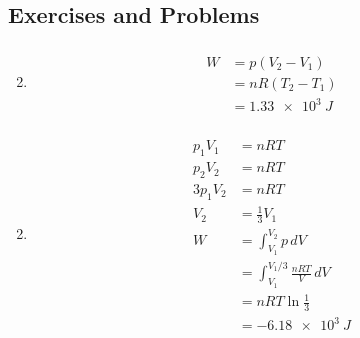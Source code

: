 \documentclass{article}
\begin{document}
\subsection{Exercises and Problems}

\subsubsection{}

\begin{enumerate}
  \setcounter{enumi}{1}
  \item

        \begin{align*}
          W & = p (V_2 - V_1)   \\
            & = n R (T_2 - T_1) \\
            & = \qty{1.33e3}{J}
        \end{align*}
\end{enumerate}

\setcounter{subsubsection}{2}
\subsubsection{}

\begin{enumerate}
  \setcounter{enumi}{1}
  \item

        \begin{align*}
          p_1 V_1   & = n R T                                      \\
          p_2 V_2   & = n R T                                      \\
          3 p_1 V_2 & = n R T                                      \\
          V_2       & = \frac{1}{3} V_1                            \\
          W         & = \int_{V_1}^{V_2} p \,d V                   \\
                    & = \int_{V_1}^{V_1 / 3} \frac{n R T}{V} \,d V \\
                    & = n R T \ln \frac{1}{3}                      \\
                    & = \qty{-6.18e3}{J}
        \end{align*}
\end{enumerate}

\setcounter{subsubsection}{4}
\subsubsection{}
\end{document}
